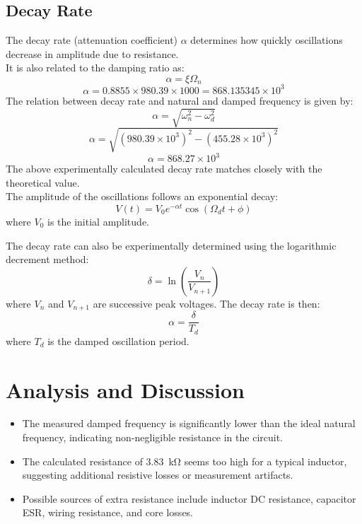 \documentclass[a4paper,12pt]{article}
\begin{document}
\subsection{Decay Rate}
The decay rate (attenuation coefficient) \(\alpha\) determines how quickly oscillations decrease in amplitude due to resistance.\\
It is also related to the damping ratio as:
\begin{equation*}
    \alpha = \xi \Omega_n
\end{equation*}
\begin{equation*}
    \alpha = 0.8855 \times 980.39 \times 1000 = 868.135345 \times 10^3
\end{equation*}
The relation between decay rate and natural and damped frequency is given by:
\begin{equation*}
    \alpha = \sqrt{\omega_n^2 - \omega_d^2}
\end{equation*}
\begin{equation*}
    \alpha = \sqrt{\left(980.39 \times 10^3\right)^2 - \left(455.28 \times 10^3\right)^2}
\end{equation*}
\begin{equation*}
    \alpha = 868.27 \times 10^3
\end{equation*}
The above experimentally calculated decay rate matches closely with the theoretical value.\\ 

The amplitude of the oscillations follows an exponential decay:
\begin{equation*}
    V(t) = V_0 e^{-\alpha t} \cos(\Omega_d t + \phi)
\end{equation*}
where \(V_0\) is the initial amplitude.

The decay rate can also be experimentally determined using the logarithmic decrement method:
\begin{equation*}
    \delta = \ln \left(\frac{V_n}{V_{n+1}}\right)
\end{equation*}
where \(V_n\) and \(V_{n+1}\) are successive peak voltages. The decay rate is then:
\begin{equation*}
    \alpha = \frac{\delta}{T_d}
\end{equation*}
where \(T_d\) is the damped oscillation period.
\section{Analysis and Discussion}
\begin{itemize}
    \item The measured damped frequency is significantly lower than the ideal natural frequency, indicating non-negligible resistance in the circuit.
    \item The calculated resistance of \SI{3.83}{\kilo\ohm} seems too high for a typical inductor, suggesting additional resistive losses or measurement artifacts.
    \item Possible sources of extra resistance include inductor DC resistance, capacitor ESR, wiring resistance, and core losses.
\end{itemize}
\end{document}
